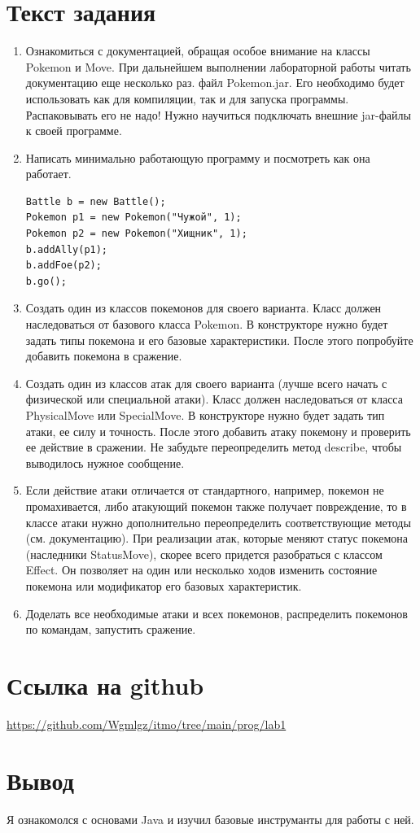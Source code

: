 \documentclass{article}
\begin{document}

\section*{Текст задания}

\begin{enumerate}
  \item Ознакомиться с документацией, обращая особое внимание на классы Pokemon и Move. При дальнейшем выполнении лабораторной работы читать документацию еще несколько раз.
   файл Pokemon.jar. Его необходимо будет использовать как для компиляции, так и для запуска программы. Распаковывать его не надо! Нужно научиться подключать внешние jar-файлы к своей программе.
  \item Написать минимально работающую программу и посмотреть как она работает.
        \begin{lstlisting}
Battle b = new Battle();
Pokemon p1 = new Pokemon("Чужой", 1);
Pokemon p2 = new Pokemon("Хищник", 1);
b.addAlly(p1);
b.addFoe(p2);
b.go();
\end{lstlisting}
  \item Создать один из классов покемонов для своего варианта. Класс должен наследоваться от базового класса Pokemon. В конструкторе нужно будет задать типы покемона и его базовые характеристики. После этого попробуйте добавить покемона в сражение.
  \item Создать один из классов атак для своего варианта (лучше всего начать с физической или специальной атаки). Класс должен наследоваться от класса PhysicalMove или SpecialMove. В конструкторе нужно будет задать тип атаки, ее силу и точность. После этого добавить атаку покемону и проверить ее действие в сражении. Не забудьте переопределить метод describe, чтобы выводилось нужное сообщение.
  \item Если действие атаки отличается от стандартного, например, покемон не промахивается, либо атакующий покемон также получает повреждение, то в классе атаки нужно дополнительно переопределить соответствующие методы (см. документацию). При реализации атак, которые меняют статус покемона (наследники StatusMove), скорее всего придется разобраться с классом Effect. Он позволяет на один или несколько ходов изменить состояние покемона или модификатор его базовых характеристик.
  \item Доделать все необходимые атаки и всех покемонов, распределить покемонов по командам, запустить сражение.
\end{enumerate}

\section*{Ссылка на github}
\url{https://github.com/Wgmlgz/itmo/tree/main/prog/lab1}

\section*{Вывод}
Я ознакомолся с основами Java и изучил базовые инструманты для работы с ней.
\end{document}
